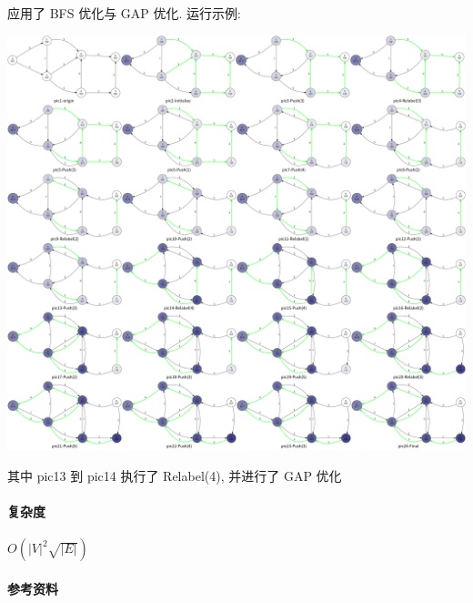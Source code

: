 应用了 BFS 优化与 GAP 优化. 运行示例:

\begin{center}
    \includegraphics[width=\textwidth]{img/hlpp.png}
\end{center}

其中 pic13 到 pic14 执行了 Relabel(4), 并进行了 GAP 优化

\paragraph{复杂度} \(O\left(|V|^2\sqrt{|E|}\right)\)

\paragraph{参考资料} \cite{oiwiki} \cite{ahuja1997computational}